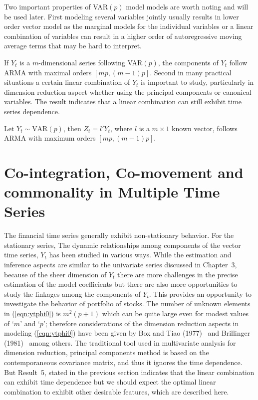 Two important properties of VAR$(p)$ model models are worth noting and will be used later. First modeling several variables jointly usually results in lower order vector model as the marginal models for the individual variables or a linear combination of variables can result in a higher order of autoregressive moving average terms that may be hard to interpret. \\


\begin{result}\label{res:5} If $Y_t$ is a $m$-dimensional series following VAR$(p)$, the components of $Y_t$ follow ARMA with maximal orders $[mp,(m-1)p]$. Second in many practical situations a certain linear combination of $Y_t$ is important to study, particularly in dimension reduction aspect whether using the principal components or canonical variables. The result indicates that a linear combination can still exhibit time series dependence. 
\end{result}


\begin{result}\label{res:6} Let $Y_t \sim \text{VAR}(p)$, then $Z_t=l'Y_t$, where $l$ is a $m \times 1$ known vector, follows ARMA with maximum orders $[mp,(m-1)p]$. 
\end{result}


\section{Co-integration, Co-movement and commonality in Multiple Time Series\label{sec:comts}}


The financial time series generally exhibit non-stationary behavior. For the stationary series, The dynamic relationships among components of the vector time series, $Y_t$ has been studied in various ways. While the estimation and inference aspects are similar to the univariate series discussed in Chapter~3, because of the sheer dimension of $Y_t$ there are more challenges in the precise estimation of the model coefficients but there are also more opportunities to study the linkages among the components of $Y_t$. This provides an opportunity to investigate the behavior of portfolio of stocks. The number of unknown elements in (\ref{eqn:ytphi0}) is $m^2(p+1)$ which can be quite large even for modest values of `$m$' and `$p$'; therefore considerations of the dimension reduction aspects in modeling (\ref{eqn:ytphi0}) have been given by Box and Tiao (1977)~\cite{box77} and Brillinger (1981)~\cite{brill81} among others. The traditional tool used in multivariate analysis for dimension reduction, principal components method is based on the contemporaneous covariance matrix, and thus it ignores the time dependence. But Result~5, stated in the previous section indicates that the linear combination can exhibit time dependence but we should expect the optimal linear combination to exhibit other desirable features, which are described here. 


